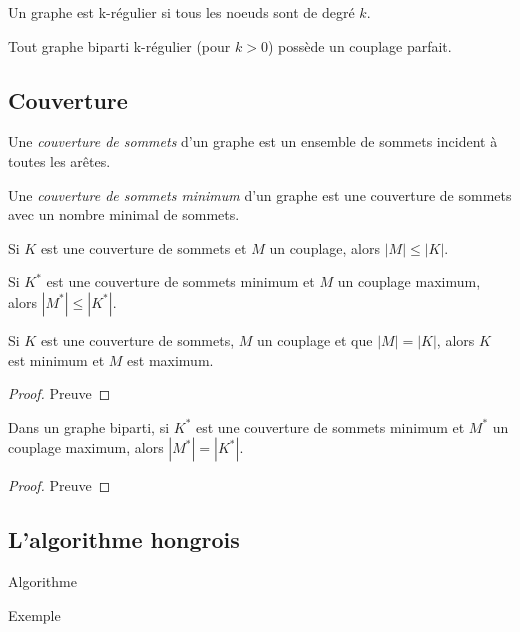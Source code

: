 \begin{myrem}
  Un graphe est k-régulier si tous les noeuds sont de degré $k$.
\end{myrem}

\begin{mycorr}
  Tout graphe biparti k-régulier (pour $k > 0$) possède un couplage parfait.
\end{mycorr}

\subsection{Couverture}
\begin{mydef}
  Une \emph{couverture de sommets} d’un graphe est un ensemble de sommets incident à toutes les arêtes.
\end{mydef}

\begin{mydef}
  Une \emph{couverture de sommets minimum} d’un graphe est une couverture de sommets avec un nombre minimal de sommets.
\end{mydef}

\begin{myrem}
  Si $K$ est une couverture de sommets et $M$ un couplage, alors $|M| \leq |K|$.
\end{myrem}

\begin{myrem}
  Si $K^*$ est une couverture de sommets minimum et $M$ un couplage maximum, alors $|M^*| \leq |K^*|$.
\end{myrem}

\begin{mylem}
  Si $K$ est une couverture de sommets, $M$ un couplage et que $|M| = |K|$, alors $K$ est minimum et $M$ est maximum.
  \begin{proof}
     Preuve \addTODO
  \end{proof}
\end{mylem}

\begin{mytheo} [König]
  Dans un graphe biparti, si $K^*$ est une couverture de sommets minimum et $M^*$ un couplage maximum, alors $|M^*| = |K^*|$.
  \begin{proof}
     Preuve \addTODO
  \end{proof}
\end{mytheo}

\subsection{L'algorithme hongrois}
\begin{myalgo}
  Algorithme \addTODO
\end{myalgo}
\begin{myexem}
  Exemple \addTODO
\end{myexem}































